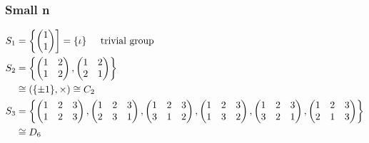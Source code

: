 \hypertarget{small-n}{%
\subsubsection{Small n}\label{small-n}}

\begin{align*}
    S_1 &= \left\{ \begin{pmatrix}1 \\1\end{pmatrix} \right] = \{ \iota \} \hspace{.5cm} \text{trivial group} \\
    S_2 &= \left\{ \begin{pmatrix}
    1 & 2 \\
    1 & 2
    \end{pmatrix}, \begin{pmatrix}
    1 & 2 \\
    2 & 1
    \end{pmatrix} \right\} \\
    &\cong \left( \{ \pm 1 \}, \times \right) \cong C_2 \\
    S_3 &= \left\{ \begin{pmatrix}
    1 & 2 & 3 \\
    1 & 2 & 3
    \end{pmatrix}, 
    \begin{pmatrix}
    1 & 2 & 3 \\
    2 & 3 & 1
    \end{pmatrix}, 
    \begin{pmatrix}
        1 & 2 & 3 \\
        3 & 1 & 2
    \end{pmatrix}, 
    \begin{pmatrix}
        1 & 2 & 3 \\
        1 & 3 & 2
    \end{pmatrix}, 
    \begin{pmatrix}
        1 & 2 & 3 \\
        3 & 2 & 1
    \end{pmatrix}, 
    \begin{pmatrix}
        1 & 2 & 3 \\
        2 & 1 & 3
    \end{pmatrix} \right\} \\
    & \cong D_6
\end{align*}

